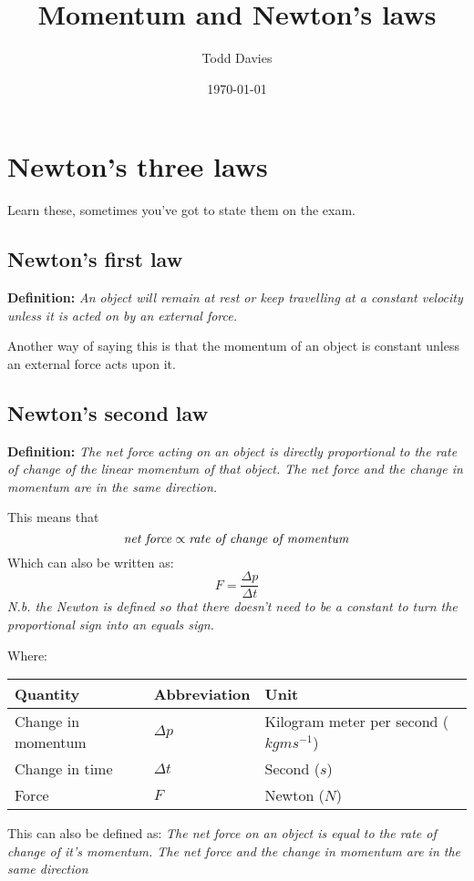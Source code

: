 \documentclass{article}
\title{Momentum and Newton's laws}
\author{Todd Davies}
\date{\today}
\begin{document}
\lhead{\today}

\maketitle

\section*{Newton's three laws}
\thispagestyle{empty}
Learn these, sometimes you've got to state them on the exam.
\subsection*{Newton's first law}
\textbf{Definition:} \textit{An object will remain at rest or keep travelling at
a constant velocity unless it is acted on by an external force.}

Another way of saying this is that the momentum of an object is constant unless
an external force acts upon it.
\subsection*{Newton's second law}
\textbf{Definition:} \textit{The net force acting on an object is directly
proportional to the rate of change of the linear momentum of that object. The
net force and the change in momentum are in the same direction.}

This means that 
\[
	\textrm{\textit{net force}} \propto \textrm{\textit{rate of change of
	momentum}}
\]
Which can also be written as:
\[
	F = \frac{\Delta p}{\Delta t}
\]
\textit{N.b. the Newton is defined so that there doesn't need to be a constant
to turn the proportional sign into an equals sign.}

Where:
\begin{center}
	\begin{tabular}{|l|l|l|}
		\hline
		Quantity & Abbreviation & Unit \\ \hline
		Change in momentum & $\Delta p$ & Kilogram meter per second
		($kgms^{-1}$) \\ \hline
		Change in time & $\Delta t$ & Second ($s$) \\ \hline
		Force & $F$ & Newton ($N$) \\ \hline
	\end{tabular}
\end{center}
This can also be defined as: \textit{The net force on an object is equal to the
rate of change of it's momentum. The net force and the change in momentum are in
the same direction}
\end{document}

